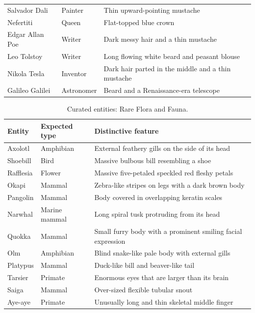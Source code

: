 \begin{table}[p]
\begin{tabular}{@{}p{}p{}p{}@{}}
\raggedright Salvador Dali & \raggedright Painter & \raggedright Thin upward-pointing mustache\tabularnewline
\raggedright Nefertiti & \raggedright Queen & \raggedright Flat-topped blue crown\tabularnewline
\raggedright Edgar Allan Poe & \raggedright Writer & \raggedright Dark messy hair and a thin mustache\tabularnewline
\raggedright Leo Tolstoy & \raggedright Writer & \raggedright Long flowing white beard and peasant blouse\tabularnewline
\raggedright Nikola Tesla & \raggedright Inventor & \raggedright Dark hair parted in the middle and a thin mustache\tabularnewline
\raggedright Galileo Galilei & \raggedright Astronomer & \raggedright Beard and a Renaissance-era telescope\tabularnewline
\bottomrule
\end{tabular}
\end{table}

\begin{table}[p]
\centering
\small
\caption{Curated entities: Rare Flora and Fauna.}
\label{tab:curated-florafauna}
\begin{tabular}{@{}p{}p{}p{}@{}}
\toprule
Entity & Expected type & Distinctive feature\tabularnewline
\midrule
\raggedright Axolotl & \raggedright Amphibian & \raggedright External feathery gills on the side of its head\tabularnewline
\raggedright Shoebill & \raggedright Bird & \raggedright Massive bulbous bill resembling a shoe\tabularnewline
\raggedright Rafflesia & \raggedright Flower & \raggedright Massive five-petaled speckled red fleshy petals\tabularnewline
\raggedright Okapi & \raggedright Mammal & \raggedright Zebra-like stripes on legs with a dark brown body\tabularnewline
\raggedright Pangolin & \raggedright Mammal & \raggedright Body covered in overlapping keratin scales\tabularnewline
\raggedright Narwhal & \raggedright Marine mammal & \raggedright Long spiral tusk protruding from its head\tabularnewline
\raggedright Quokka & \raggedright Mammal & \raggedright Small furry body with a prominent smiling facial expression\tabularnewline
\raggedright Olm & \raggedright Amphibian & \raggedright Blind snake-like pale body with external gills\tabularnewline
\raggedright Platypus & \raggedright Mammal & \raggedright Duck-like bill and beaver-like tail\tabularnewline
\raggedright Tarsier & \raggedright Primate & \raggedright Enormous eyes that are larger than its brain\tabularnewline
\raggedright Saiga & \raggedright Mammal & \raggedright Over-sized flexible tubular snout\tabularnewline
\raggedright Aye-aye & \raggedright Primate & \raggedright Unusually long and thin skeletal middle finger\tabularnewline

\end{tabular}
\end{table}
